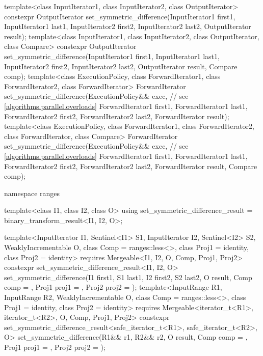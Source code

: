 \begin{codeblock}
{  template<class InputIterator1, class InputIterator2, class OutputIterator>
    constexpr OutputIterator
      set_symmetric_difference(InputIterator1 first1, InputIterator1 last1,
                               InputIterator2 first2, InputIterator2 last2,
                               OutputIterator result);
  template<class InputIterator1, class InputIterator2, class OutputIterator, class Compare>
    constexpr OutputIterator
      set_symmetric_difference(InputIterator1 first1, InputIterator1 last1,
                               InputIterator2 first2, InputIterator2 last2,
                               OutputIterator result, Compare comp);
  template<class ExecutionPolicy, class ForwardIterator1, class ForwardIterator2,
           class ForwardIterator>
    ForwardIterator
      set_symmetric_difference(ExecutionPolicy&& exec, // see \ref{algorithms.parallel.overloads}
                               ForwardIterator1 first1, ForwardIterator1 last1,
                               ForwardIterator2 first2, ForwardIterator2 last2,
                               ForwardIterator result);
  template<class ExecutionPolicy, class ForwardIterator1, class ForwardIterator2,
           class ForwardIterator, class Compare>
    ForwardIterator
      set_symmetric_difference(ExecutionPolicy&& exec, // see \ref{algorithms.parallel.overloads}
                               ForwardIterator1 first1, ForwardIterator1 last1,
                               ForwardIterator2 first2, ForwardIterator2 last2,
                               ForwardIterator result, Compare comp);

  namespace ranges {
    template<class I1, class I2, class O>
    using set_symmetric_difference_result = binary_transform_result<I1, I2, O>;

    template<InputIterator I1, Sentinel<I1> S1, InputIterator I2, Sentinel<I2> S2,
        WeaklyIncrementable O, class Comp = ranges::less<>, class Proj1 = identity, class Proj2 = identity>
      requires Mergeable<I1, I2, O, Comp, Proj1, Proj2>
      constexpr set_symmetric_difference_result<I1, I2, O>
        set_symmetric_difference(I1 first1, S1 last1, I2 first2, S2 last2, O result,
                                 Comp comp = {}, Proj1 proj1 = {},
                                 Proj2 proj2 = {});
    template<InputRange R1, InputRange R2, WeaklyIncrementable O,
        class Comp = ranges::less<>, class Proj1 = identity, class Proj2 = identity>
      requires Mergeable<iterator_t<R1>, iterator_t<R2>, O, Comp, Proj1, Proj2>
      constexpr set_symmetric_difference_result<safe_iterator_t<R1>, safe_iterator_t<R2>, O>
        set_symmetric_difference(R1&& r1, R2&& r2, O result, Comp comp = {},
                                 Proj1 proj1 = {}, Proj2 proj2 = {});
  }

}
\end{codeblock}
